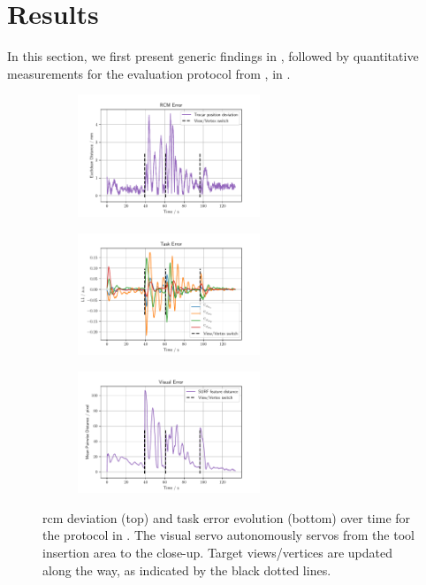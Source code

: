 \section{Results}
\label{c2:sec:results}
In this section, we first present generic findings in , followed by quantitative measurements for the evaluation protocol from , in .
\begin{figure}
\centering
\begin{subfigure}[b]{\textwidth}
    \centering
    \includegraphics[width=0.6\textwidth]{fig/rcm_error.pdf}
\end{subfigure}
\begin{subfigure}[b]{\textwidth}
    \centering
    \includegraphics[width=0.6\textwidth]{fig/task_error.pdf}
\end{subfigure}
\begin{subfigure}[b]{\textwidth}
\centering
\includegraphics[width=0.6\textwidth]{fig/visual_error.pdf}
\end{subfigure}
\caption{\gls{rcm} deviation (top) and task error evolution (bottom) over time for the protocol in . The visual servo autonomously servos from the tool insertion area to the close-up. Target views/vertices are updated along the way, as indicated by the black dotted lines.}
\label{c2:fig:errors}
\end{figure}
